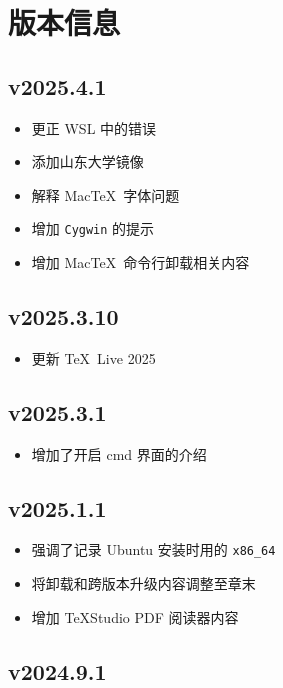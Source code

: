 
\chapter{版本信息}

\section*{v2025.4.1}

\begin{itemize}
  \item 更正 WSL 中的错误
  \item 添加山东大学镜像
  \item 解释 Mac\TeX\ 字体问题
  \item 增加 \texttt{Cygwin} 的提示
  \item 增加 Mac\TeX\ 命令行卸载相关内容
\end{itemize}

\section*{v2025.3.10}

\begin{itemize}
  \item 更新 \TeX\ Live 2025
\end{itemize}

\section*{v2025.3.1}

\begin{itemize}
  \item 增加了开启 \textsf{cmd} 界面的介绍
\end{itemize}

\section*{v2025.1.1}

\begin{itemize}
  \item 强调了记录 Ubuntu 安装时用的 \texttt{x86\_64}
  \item 将卸载和跨版本升级内容调整至章末
  \item 增加 \TeX Studio PDF 阅读器内容
\end{itemize}

\section*{v2024.9.1}

